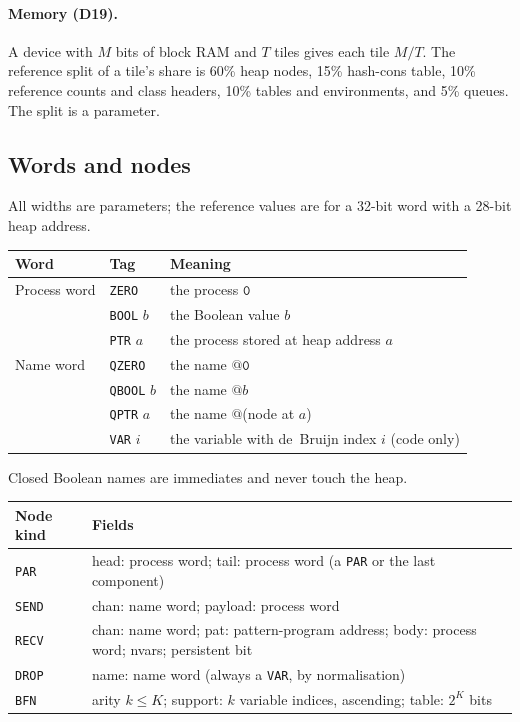 \documentclass[11pt]{article}
\makeatletter
\newcommand{\kw}[1]{\texttt{#1}}
\newcommand{\nil}{\kw{0}}
\newcommand{\quo}[1]{@#1}
\newcommand{\dec}[1]{\textbf{D#1}}
\theoremstyle{definition}
\theoremstyle{remark}
\makeatother
\begin{document}
\paragraph{Memory (\dec{19}).} A device with $M$ bits of block RAM and $T$
tiles gives each tile $M/T$. The reference split of a tile's share is 60\%
heap nodes, 15\% hash-cons table, 10\% reference counts and class headers,
10\% tables and environments, and 5\% queues. The split is a parameter.

\subsection{Words and nodes}\label{sec:words}

All widths are parameters; the reference values are for a 32-bit word with a
28-bit heap address.

\medskip\noindent
\begin{tabularx}{\textwidth}{@{}l l X@{}}
\toprule
Word & Tag & Meaning\\
\midrule
Process word & \kw{ZERO} & the process $\nil$\\
             & \kw{BOOL} $b$ & the Boolean value $b$\\
             & \kw{PTR} $a$ & the process stored at heap address $a$\\
\addlinespace
Name word & \kw{QZERO} & the name $\quo{\nil}$\\
          & \kw{QBOOL} $b$ & the name $\quo{b}$\\
          & \kw{QPTR} $a$ & the name $\quo{}$(node at $a$)\\
          & \kw{VAR} $i$ & the variable with de~Bruijn index $i$ (code only)\\
\bottomrule
\end{tabularx}

\medskip\noindent
Closed Boolean names are immediates and never touch the heap.

\medskip\noindent
\begin{tabularx}{\textwidth}{@{}l X@{}}
\toprule
Node kind & Fields\\
\midrule
\kw{PAR}   & head: process word; tail: process word (a \kw{PAR} or the last component)\\
\kw{SEND}  & chan: name word; payload: process word\\
\kw{RECV}  & chan: name word; pat: pattern-program address; body: process
             word; nvars; persistent bit\\
\kw{DROP}  & name: name word (always a \kw{VAR}, by normalisation)\\
\kw{BFN}   & arity $k \le K$; support: $k$ variable indices, ascending;
             table: $2^K$ bits\\
\bottomrule
\end{tabularx}
\end{document}
